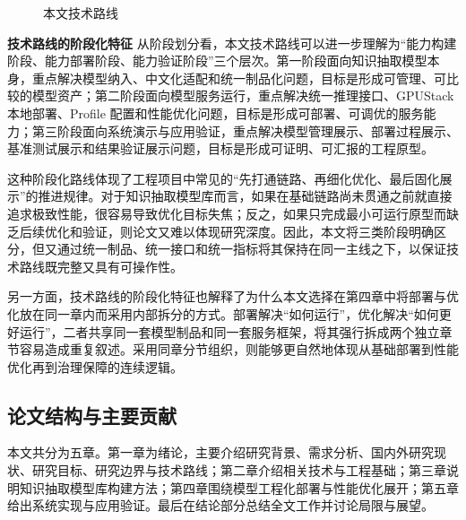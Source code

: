 \begin{figure}[htbp]
  \centering
  \caption{本文技术路线}
  \label{fig:intro_route_expand}
\end{figure}

\par\textbf{技术路线的阶段化特征}
从阶段划分看，本文技术路线可以进一步理解为“能力构建阶段、能力部署阶段、能力验证阶段”三个层次。第一阶段面向知识抽取模型本身，重点解决模型纳入、中文化适配和统一制品化问题，目标是形成可管理、可比较的模型资产；第二阶段面向模型服务运行，重点解决统一推理接口、GPUStack 本地部署、Profile 配置和性能优化问题，目标是形成可部署、可调优的服务能力；第三阶段面向系统演示与应用验证，重点解决模型管理展示、部署过程展示、基准测试展示和结果验证展示问题，目标是形成可证明、可汇报的工程原型。

这种阶段化路线体现了工程项目中常见的“先打通链路、再细化优化、最后固化展示”的推进规律。对于知识抽取模型库而言，如果在基础链路尚未贯通之前就直接追求极致性能，很容易导致优化目标失焦；反之，如果只完成最小可运行原型而缺乏后续优化和验证，则论文又难以体现研究深度。因此，本文将三类阶段明确区分，但又通过统一制品、统一接口和统一指标将其保持在同一主线之下，以保证技术路线既完整又具有可操作性。

另一方面，技术路线的阶段化特征也解释了为什么本文选择在第四章中将部署与优化放在同一章内而采用内部拆分的方式。部署解决“如何运行”，优化解决“如何更好运行”，二者共享同一套模型制品和同一套服务框架，将其强行拆成两个独立章节容易造成重复叙述。采用同章分节组织，则能够更自然地体现从基础部署到性能优化再到治理保障的连续逻辑。

\subsection{论文结构与主要贡献}
本文共分为五章。第一章为绪论，主要介绍研究背景、需求分析、国内外研究现状、研究目标、研究边界与技术路线；第二章介绍相关技术与工程基础；第三章说明知识抽取模型库构建方法；第四章围绕模型工程化部署与性能优化展开；第五章给出系统实现与应用验证。最后在结论部分总结全文工作并讨论局限与展望。

